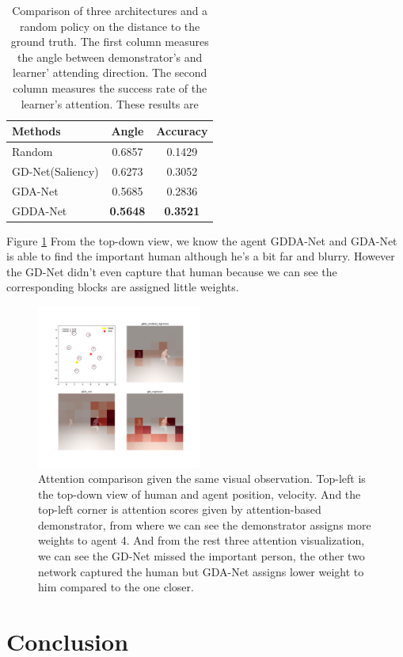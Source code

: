 \documentclass[10pt,twocolumn,letterpaper]{article}
\begin{document}
\begin{table} \label{tb:attention_diff}
\begin{center}
\begin{tabular}{|l|c|c|}
\hline
Methods & Angle & Accuracy\\
\hline
Random                  & 0.6857 & 0.1429 \\
\hline
GD-Net(Saliency)        & 0.6273 & 0.3052 \\
GDA-Net                 & 0.5685 & 0.2836 \\
GDDA-Net                & \textbf{0.5648} & \textbf{0.3521} \\
\hline
\end{tabular}
\end{center}
\caption{Comparison of three architectures and a random policy on the distance to the ground truth. The first column measures the angle between demonstrator's and learner' attending direction. The second column measures the success rate of the learner's attention. These results are }
\end{table}

Figure \ref{fig:attention_comparison} From the top-down view, we know the agent GDDA-Net and GDA-Net is able to find the important human although he's a bit far and blurry. However the GD-Net didn't even capture that human because we can see the corresponding blocks are assigned little weights. 

\begin{figure}[tb]\label{fig:attention_comparison}
  \centering
  \includegraphics[width=0.48\textwidth]{figures/attention_comparison.png}
  \caption{Attention comparison given the same visual observation. Top-left is the top-down view of human and agent position, velocity. And the top-left corner is attention scores given by attention-based demonstrator, from where we can see the demonstrator assigns more weights to agent 4. And from the rest three attention visualization, we can see the GD-Net missed the important person, the other two network captured the human but GDA-Net assigns lower weight to him compared to the one closer.}
\end{figure}

\section{Conclusion}



{\small


}
\end{document}
